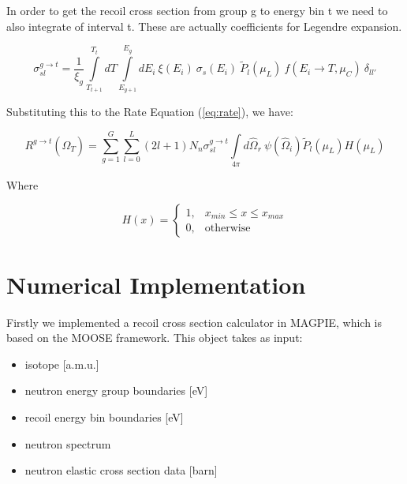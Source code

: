\documentclass[review]{elsarticle}
\begin{document}
In order to get the recoil cross section from group g to energy bin t we need to also integrate of interval t. These are actually coefficients for Legendre expansion. 

\begin{equation}
	{\sigma}_{sl}^{g \rightarrow t} = \frac{1}{\xi_g}  \int\limits_{{T}_{t+1}}^{T_t} d T \int\limits_{E_{g+1}}^{E_g} dE_i \ \xi (E_i) \  \sigma_s (E_i)  \ \tilde P_l \left( \mu_L\right) \ f(E_i \rightarrow T, \mu_C) \ \delta_{ll'}
	\label{eq:xs_coeff}
\end{equation}

Substituting this to the Rate Equation (\ref{eq:rate}), we have: 

\begin{equation}
	R^{g \rightarrow t} (\hat{\Omega}_T) = \sum\limits_{g = 1}^{G}  \sum\limits_{l = 0}^{L} (2 l + 1) N_n {\sigma}_{sl}^{g \rightarrow t} \int\limits_{4\pi} d \hat{\Omega}_r \  \psi(\hat{\Omega}_i) \tilde P_l (\mu_L) H(\mu_L)
	\label{eq:ratefinal}
\end{equation}

Where 

\begin{equation}
	H(x) = 
	\begin{cases}
	1 ,&  x_{min} \leq x \leq x_{max} \\
	0 ,& \text{otherwise}
	\end{cases}
\end{equation}

\section{Numerical Implementation}

Firstly we implemented a recoil cross section calculator in MAGPIE, which is based on the MOOSE framework. This object takes as input: 

\begin{itemize}
 	\item isotope [a.m.u.]
	 \item neutron energy group boundaries [eV]
	 \item recoil energy bin boundaries [eV]
	 \item neutron spectrum 
	 \item neutron elastic cross section data [barn]
\end{itemize}
\end{document}
